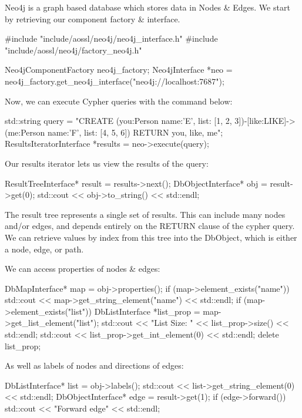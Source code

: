 Neo4j is a graph based database which stores data in Nodes \& Edges. We start by retrieving our component factory \& interface. \begin{DoxyVerb}#include "include/aossl/neo4j/neo4j_interface.h"
#include "include/aossl/neo4j/factory_neo4j.h"

Neo4jComponentFactory neo4j_factory;
Neo4jInterface *neo = neo4j_factory.get_neo4j_interface("neo4j://localhost:7687");
\end{DoxyVerb}


Now, we can execute Cypher queries with the command below\+: \begin{DoxyVerb}std::string query = "CREATE (you:Person {name:'E', list: [1, 2, 3]})-[like:LIKE]->(me:Person {name:'F', list: [4, 5, 6]}) RETURN you, like, me";
ResultsIteratorInterface *results = neo->execute(query);
\end{DoxyVerb}


Our results iterator lets us view the results of the query\+: \begin{DoxyVerb}ResultTreeInterface* result = results->next();
DbObjectInterface* obj = result->get(0);
std::cout << obj->to_string() << std::endl;
\end{DoxyVerb}


The result tree represents a single set of results. This can include many nodes and/or edges, and depends entirely on the R\+E\+T\+U\+RN clause of the cypher query. We can retrieve values by index from this tree into the Db\+Object, which is either a node, edge, or path.

We can access properties of nodes \& edges\+: \begin{DoxyVerb}DbMapInterface* map = obj->properties();
if (map->element_exists("name")) {
  std::cout << map->get_string_element("name") << std::endl;
}
if (map->element_exists("list")) {
  DbListInterface *list_prop = map->get_list_element("list");
  std::cout << "List Size: " << list_prop->size() << std::endl;
  std::cout << list_prop->get_int_element(0) << std::endl;
  delete list_prop;
}
\end{DoxyVerb}


As well as labels of nodes and directions of edges\+: \begin{DoxyVerb}DbListInterface* list = obj->labels();
std::cout << list->get_string_element(0) << std::endl;
DbObjectInterface* edge = result->get(1);
if (edge->forward()) {
  std::cout << "Forward edge" << std::endl;
}
\end{DoxyVerb}



